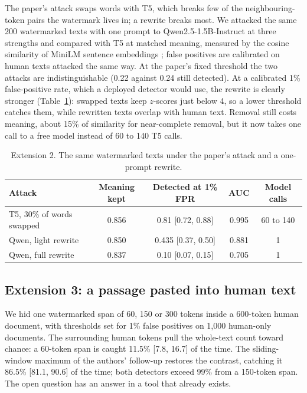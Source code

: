 \documentclass[12pt,letterpaper]{article}
\begin{document}
The paper's attack swaps words with T5, which breaks few of the neighbouring-token pairs the watermark lives in; a rewrite breaks most. We attacked the same 200 watermarked texts with one prompt to Qwen2.5-1.5B-Instruct at three strengths and compared with T5 at matched meaning, measured by the cosine similarity of MiniLM sentence embeddings \citep{reimers2019sbert}; false positives are calibrated on human texts attacked the same way. At the paper's fixed threshold the two attacks are indistinguishable (0.22 against 0.24 still detected). At a calibrated 1\% false-positive rate, which a deployed detector would use, the rewrite is clearly stronger (Table~\ref{tab:ext2}): swapped texts keep $z$-scores just below 4, so a lower threshold catches them, while rewritten texts overlap with human text. Removal still costs meaning, about 15\% of similarity for near-complete removal, but it now takes one call to a free model instead of 60 to 140 T5 calls.

\begin{table}[htbp]
\centering\singlespacing\small
\caption{Extension 2. The same watermarked texts under the paper's attack and a one-prompt rewrite.}
\label{tab:ext2}
\begin{tabular}{lcccc}
\toprule
Attack & Meaning kept & Detected at 1\% FPR & AUC & Model calls \\
\midrule
T5, 30\% of words swapped & 0.856 & 0.81 [0.72, 0.88] & 0.995 & 60 to 140 \\
Qwen, light rewrite & 0.850 & 0.435 [0.37, 0.50] & 0.881 & 1 \\
Qwen, full rewrite & 0.837 & 0.10 [0.07, 0.15] & 0.705 & 1 \\
\bottomrule
\end{tabular}
\end{table}

\subsection{Extension 3: a passage pasted into human text}

We hid one watermarked span of 60, 150 or 300 tokens inside a 600-token human document, with thresholds set for 1\% false positives on 1,000 human-only documents. The surrounding human tokens pull the whole-text count toward chance: a 60-token span is caught 11.5\% [7.8, 16.7] of the time. The sliding-window maximum of the authors' follow-up \citep{kirchenbauer2024reliability} restores the contrast, catching it 86.5\% [81.1, 90.6] of the time; both detectors exceed 99\% from a 150-token span. The open question has an answer in a tool that already exists.
\end{document}

